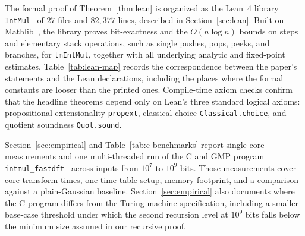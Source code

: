 The formal proof of Theorem~\ref{thm:lean} is organized as the Lean~4 library \texttt{IntMul}~\cite{LeanMS26} of $27$ files and $82{,}377$ lines, described in Section~\ref{sec:lean}. Built on Mathlib~\cite{Mathlib20}, the library proves bit-exactness and the $O(n \log n)$ bounds on steps and elementary stack operations, such as single pushes, pops, peeks, and branches, for \texttt{tmIntMul}, together with all underlying analytic and fixed-point estimates. Table~\ref{tab:lean-map} records the correspondence between the paper's statements and the Lean declarations, including the places where the formal constants are looser than the printed ones. Compile-time axiom checks confirm that the headline theorems depend only on Lean's three standard logical axioms: propositional extensionality \texttt{propext}, classical choice \texttt{Classical.choice}, and quotient soundness \texttt{Quot.sound}.

Section~\ref{sec:empirical} and Table~\ref{tab:c-benchmarks} report single-core measurements and one multi-threaded run of the C and GMP program \texttt{intmul\_fastdft}~\cite{CGMP26} across inputs from $10^7$ to $10^9$ bits. Those measurements cover core transform times, one-time table setup, memory footprint, and a comparison against a plain-Gaussian baseline. Section~\ref{sec:empirical} also documents where the C program differs from the Turing machine specification, including a smaller base-case threshold under which the second recursion level at $10^9$ bits falls below the minimum size assumed in our recursive proof.

